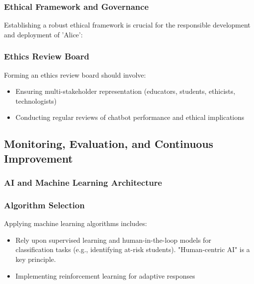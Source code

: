 \documentclass[14pt,a4paper]{article}
\begin{document}
\begin{multicols}{2}
\subsubsection{Ethical Framework and Governance}
Establishing a robust ethical framework is crucial for the responsible development and deployment of 'Alice':

\subsubsection*{Ethics Review Board}
Forming an ethics review board \textit{\parencite{UNESCO2023}} should involve:
\begin{itemize}
    \item Ensuring multi-stakeholder representation (educators, students, ethicists, technologists)
    \item Conducting regular reviews of chatbot performance and ethical implications
\end{itemize}







\subsection{Monitoring, Evaluation, and Continuous Improvement}
\subsubsection{AI and Machine Learning Architecture}

\subsubsection*{Algorithm Selection}
Applying machine learning algorithms \textit{\parencite[pp. 25-50]{Geron2024}} includes:
\begin{itemize}
    \item Rely upon supervised learning and human-in-the-loop models for classification tasks (e.g., identifying at-risk students). "Human-centric AI" is a key principle.
    \item Implementing reinforcement learning for adaptive responses
\end{itemize}

\end{multicols}
\end{document}
